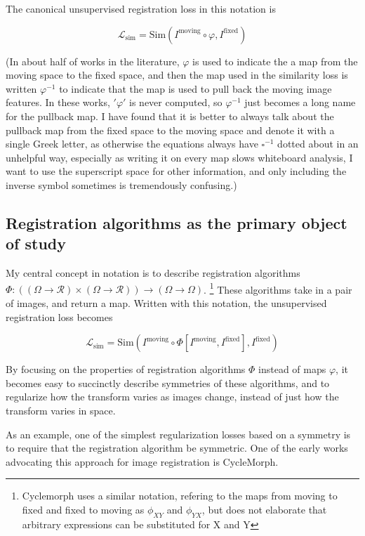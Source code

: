 \documentclass{article}
\begin{document}
The canonical unsupervised registration loss in this notation is

$$\mathcal{L}_\text{sim} = \text{Sim}(I^\text{moving} \circ  \varphi , I^\text{fixed}) $$

(In about half of works in the literature, $\varphi$ is used to indicate the a map from the moving space to the fixed space, and then the map used in the similarity loss is written $\varphi^{-1}$ to indicate that the map is used to pull back the moving image features. In these works, $'\varphi'$ is never computed, so $\varphi^{-1}$ just becomes a long name for the pullback map. I have found that it is better to always talk about the pullback map from the fixed space to the moving space and denote it with a single Greek letter, as otherwise the equations always have $\square^{-1}$ dotted about in an unhelpful way, especially as writing it on every map slows whiteboard analysis, I want to use the superscript space for other information, and only including the inverse symbol sometimes is tremendously confusing.)
\subsection{Registration algorithms as the primary object of study}

My central concept in notation is to describe registration algorithms $\Phi:
	\left( (\Omega \rightarrow \mathcal{R}) \times (\Omega \rightarrow \mathcal{R})
	\right) \rightarrow (\Omega \rightarrow \Omega) $. \footnote{Cyclemorph
	\cite{cyclemorph} uses a similar notation, refering to the maps from moving to
	fixed and fixed to moving as $\phi_{XY}$ and $\phi_{YX}$, but does not
	elaborate that arbitrary expressions can be substituted for X and Y} These
algorithms take in a pair of images, and return a map. Written with this
notation, the unsupervised registration loss becomes

$$ \mathcal{L}_\text{sim} = \text{Sim}(I^\text{moving} \circ  \Phi[I^\text{moving}, I^\text{fixed}] , I^\text{fixed}) $$

By focusing on the properties of registration algorithms $\Phi$ instead of maps
$\varphi$, it becomes easy to succinctly describe symmetries of these
algorithms, and to regularize how the transform varies as images change,
instead of just how the transform varies in space.

As an example, one of the simplest regularization losses based on a symmetry is
to require that the registration algorithm be symmetric. One of the early works
advocating this approach for image registration is CycleMorph.
\end{document}
